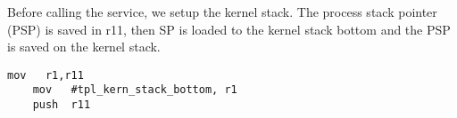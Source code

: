 \documentclass[11pt, oneside]{article}   	%
\begin{document}
%
%
%

Before calling the service, we setup the kernel stack. The process stack pointer (PSP) is saved in r11, then SP is loaded to the kernel stack bottom and the PSP is saved on the kernel stack.

\begin{lstlisting}[backgroundcolor=\color{red!15}]
    mov   r1,r11
    mov   #tpl_kern_stack_bottom, r1
    push  r11
\end{lstlisting}
\end{document}
